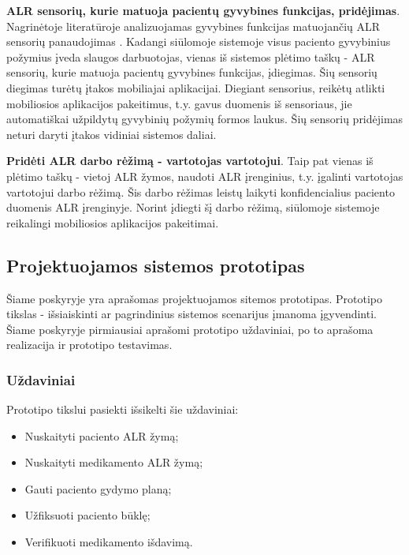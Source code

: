 \textbf{ALR sensorių, kurie matuoja pacientų gyvybines funkcijas, pridėjimas}. Nagrinėtoje literatūroje analizuojamas gyvybines funkcijas matuojančių ALR sensorių panaudojimas \cite{Strommer2006}. Kadangi siūlomoje sistemoje visus paciento gyvybinius požymius įveda slaugos darbuotojas, vienas iš sistemos plėtimo taškų - ALR sensorių, kurie matuoja pacientų gyvybines funkcijas, įdiegimas. Šių sensorių diegimas turėtų įtakos mobiliajai aplikacijai. Diegiant sensorius, reikėtų atlikti mobiliosios aplikacijos pakeitimus, t.y. gavus duomenis iš sensoriaus, jie automatiškai užpildytų gyvybinių požymių formos laukus. Šių sensorių pridėjimas neturi daryti įtakos vidiniai sistemos daliai.

\textbf{Pridėti ALR darbo rėžimą - vartotojas vartotojui}. Taip pat vienas iš plėtimo taškų - vietoj ALR žymos, naudoti ALR įrenginius, t.y. įgalinti vartotojas vartotojui darbo rėžimą. Šis darbo rėžimas leistų laikyti konfidencialius paciento duomenis ALR įrenginyje. Norint įdiegti šį darbo rėžimą, siūlomoje sistemoje reikalingi mobiliosios aplikacijos pakeitimai.



\subsection{Projektuojamos sistemos prototipas}
Šiame poskyryje yra aprašomas projektuojamos sitemos prototipas. Prototipo tikslas - išsiaiskinti ar pagrindinius sistemos scenarijus įmanoma įgyvendinti. Šiame poskyryje pirmiausiai aprašomi prototipo uždaviniai, po to aprašoma realizacija ir prototipo testavimas.

\subsubsection{Uždaviniai}
Prototipo tikslui pasiekti išsikelti šie uždaviniai:

\begin{itemize}
    \item Nuskaityti paciento ALR žymą;
    \item Nuskaityti medikamento ALR žymą;
    \item Gauti paciento gydymo planą;
    \item Užfiksuoti paciento būklę;
    \item Verifikuoti medikamento išdavimą.
\end{itemize}


